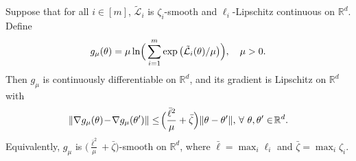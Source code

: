 \documentclass[sigconf]{acmart}
\begin{document}
\begin{lemma}\label{lem:lse_smoothness}
Suppose that for all $i\in[m]$,
$\tilde{\mathcal{L}}_i$ is $\zeta_i$-smooth and $\ell_i$-Lipschitz continuous on $\mathbb{R}^d$.
Define
\begin{align}
    g_{\mu}(\theta)=\mu\ln\!\Big(\sum_{i=1}^{m}\exp\big(\tilde{\mathcal{L}}_i(\theta)/\mu\big)\Big),
    \quad \mu>0 \notag.
\end{align}
Then $g_{\mu}$ is continuously differentiable on $\mathbb{R}^d$, and its gradient is Lipschitz on $\mathbb{R}^d$ with
\begin{align}
    \|\nabla g_{\mu}(\theta)\!-\!\nabla g_{\mu}(\theta')\|
    \le\!
    \Big(\frac{\bar{\ell}^2}{\mu}+\bar{\zeta}\Big)
    \|\theta-\theta'\|,\, \forall~\theta,\theta'\in \!\mathbb{R}^d \notag.
\end{align} %
Equivalently, $g_{\mu}$ is $\Big(\frac{\bar{\ell}^2}{\mu}+\bar{\zeta}\Big)$-smooth on $\mathbb{R}^d$, where $\bar{\ell}=\max_{i}\ell_i$ and $\bar{\zeta}=\max_{i}\zeta_i$.
\end{lemma}
\end{document}
